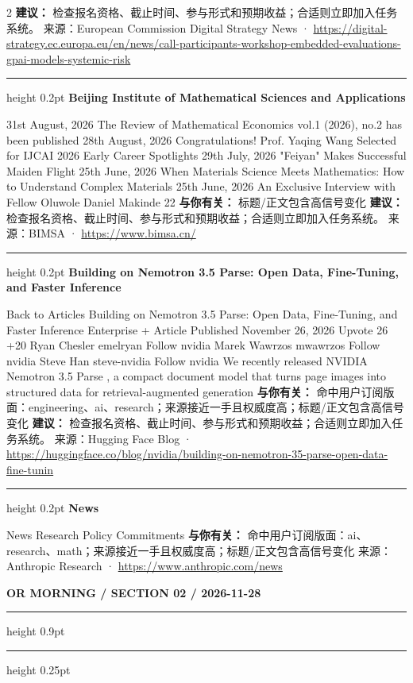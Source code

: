 \documentclass[10.5pt]{ctexart}
\begin{document}
\begin{multicols}{2}
\textbf{建议：} 检查报名资格、截止时间、参与形式和预期收益；合适则立即加入任务系统。
{\footnotesize\color{ormuted} 来源：European Commission Digital Strategy News · \url{https://digital-strategy.ec.europa.eu/en/news/call-participants-workshop-embedded-evaluations-gpai-models-systemic-risk}}
\vspace{2mm}
\hrule height 0.2pt
\vspace{2mm}
{\large\bfseries Beijing Institute of Mathematical Sciences and Applications}\par
31st August, 2026 The Review of Mathematical Economics vol.1 (2026), no.2 has been published 28th August, 2026 Congratulations! Prof. Yaqing Wang Selected for IJCAI 2026 Early Career Spotlights 29th July, 2026 "Feiyan" Makes Successful Maiden Flight 25th June, 2026 When Materials Science Meets Mathematics: How to Understand Complex Materials 25th June, 2026 An Exclusive Interview with Fellow Oluwole Daniel Makinde 22
\textbf{与你有关：} 标题/正文包含高信号变化
\textbf{建议：} 检查报名资格、截止时间、参与形式和预期收益；合适则立即加入任务系统。
{\footnotesize\color{ormuted} 来源：BIMSA · \url{https://www.bimsa.cn/}}
\vspace{2mm}
\hrule height 0.2pt
\vspace{2mm}
{\large\bfseries Building on Nemotron 3.5 Parse: Open Data, Fine-Tuning, and Faster Inference}\par
Back to Articles Building on Nemotron 3.5 Parse: Open Data, Fine-Tuning, and Faster Inference Enterprise + Article Published November 26, 2026 Upvote 26 +20 Ryan Chesler emelryan Follow nvidia Marek Wawrzos mwawrzos Follow nvidia Steve Han steve-nvidia Follow nvidia We recently released NVIDIA Nemotron 3.5 Parse , a compact document model that turns page images into structured data for retrieval-augmented generation 
\textbf{与你有关：} 命中用户订阅版面：engineering、ai、research；来源接近一手且权威度高；标题/正文包含高信号变化
\textbf{建议：} 检查报名资格、截止时间、参与形式和预期收益；合适则立即加入任务系统。
{\footnotesize\color{ormuted} 来源：Hugging Face Blog · \url{https://huggingface.co/blog/nvidia/building-on-nemotron-35-parse-open-data-fine-tunin}}
\vspace{2mm}
\hrule height 0.2pt
\vspace{2mm}
{\large\bfseries News}\par
News Research Policy Commitments
\textbf{与你有关：} 命中用户订阅版面：ai、research、math；来源接近一手且权威度高；标题/正文包含高信号变化
{\footnotesize\color{ormuted} 来源：Anthropic Research · \url{https://www.anthropic.com/news}}
\end{multicols}
\newpage
{\small\bfseries OR MORNING / SECTION 02 / 2026-11-28}
\vspace{2mm}
\hrule height 0.9pt
\vspace{1.5mm}
\hrule height 0.25pt
\vspace{4mm}
\end{document}
